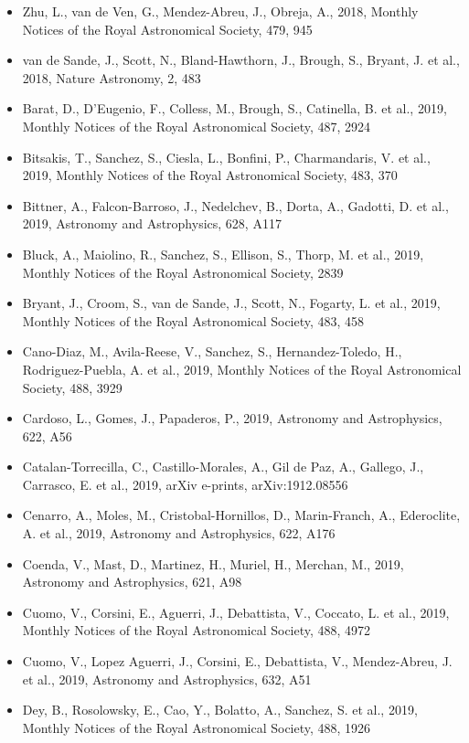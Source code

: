 \documentclass{letter}
\begin{document}
\begin{enumerate}
\begin{itemize}
\item Zhu, L., van de Ven, G., Mendez-Abreu, J., Obreja, A., 2018, Monthly Notices of the Royal Astronomical Society, 479, 945
\item van de Sande, J., Scott, N., Bland-Hawthorn, J., Brough, S., Bryant, J. et al., 2018, Nature Astronomy, 2, 483
\item Barat, D., D'Eugenio, F., Colless, M., Brough, S., Catinella, B. et al., 2019, Monthly Notices of the Royal Astronomical Society, 487, 2924
\item Bitsakis, T., Sanchez, S., Ciesla, L., Bonfini, P., Charmandaris, V. et al., 2019, Monthly Notices of the Royal Astronomical Society, 483, 370
\item Bittner, A., Falcon-Barroso, J., Nedelchev, B., Dorta, A., Gadotti, D. et al., 2019, Astronomy and Astrophysics, 628, A117
\item Bluck, A., Maiolino, R., Sanchez, S., Ellison, S., Thorp, M. et al., 2019, Monthly Notices of the Royal Astronomical Society, 2839
\item Bryant, J., Croom, S., van de Sande, J., Scott, N., Fogarty, L. et al., 2019, Monthly Notices of the Royal Astronomical Society, 483, 458
\item Cano-Diaz, M., Avila-Reese, V., Sanchez, S., Hernandez-Toledo, H., Rodriguez-Puebla, A. et al., 2019, Monthly Notices of the Royal Astronomical Society, 488, 3929
\item Cardoso, L., Gomes, J., Papaderos, P., 2019, Astronomy and Astrophysics, 622, A56
\item Catalan-Torrecilla, C., Castillo-Morales, A., Gil de Paz, A., Gallego, J., Carrasco, E. et al., 2019, arXiv e-prints, arXiv:1912.08556
\item Cenarro, A., Moles, M., Cristobal-Hornillos, D., Marin-Franch, A., Ederoclite, A. et al., 2019, Astronomy and Astrophysics, 622, A176
\item Coenda, V., Mast, D., Martinez, H., Muriel, H., Merchan, M., 2019, Astronomy and Astrophysics, 621, A98
\item Cuomo, V., Corsini, E., Aguerri, J., Debattista, V., Coccato, L. et al., 2019, Monthly Notices of the Royal Astronomical Society, 488, 4972
\item Cuomo, V., Lopez Aguerri, J., Corsini, E., Debattista, V., Mendez-Abreu, J. et al., 2019, Astronomy and Astrophysics, 632, A51
\item Dey, B., Rosolowsky, E., Cao, Y., Bolatto, A., Sanchez, S. et al., 2019, Monthly Notices of the Royal Astronomical Society, 488, 1926

\end{itemize}
\end{enumerate}
\end{document}
